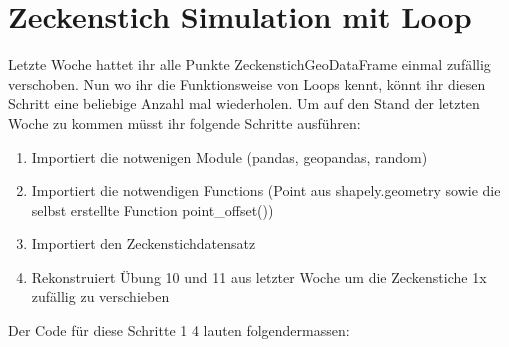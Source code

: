\documentclass[letterpaper,10pt,english]{sphinxmanual}
\begin{document}
\chapter{Zeckenstich Simulation mit Loop}
\label{\detokenize{03_03_Zeckenstich_Simulation:zeckenstich-simulation-mit-loop}}\label{\detokenize{03_03_Zeckenstich_Simulation::doc}}
Letzte Woche hattet ihr alle Punkte Zeckenstich\sphinxhyphen{}GeoDataFrame einmal zufällig verschoben. Nun wo ihr die Funktionsweise von Loops kennt, könnt ihr diesen Schritt eine beliebige Anzahl mal wiederholen. Um auf den Stand der letzten Woche zu kommen müsst ihr folgende Schritte ausführen:
\begin{enumerate}
%
\item {} 
Importiert die notwenigen Module (pandas, geopandas, random)

\item {} 
Importiert die notwendigen Functions (Point aus shapely.geometry sowie die selbst erstellte Function point\_offset())

\item {} 
Importiert den Zeckenstichdatensatz

\item {} 
Rekonstruiert Übung 10 und 11 aus letzter Woche um die Zeckenstiche 1x zufällig zu verschieben

\end{enumerate}

Der Code für diese Schritte 1 \textendash{} 4 lauten folgendermassen:
\end{document}
